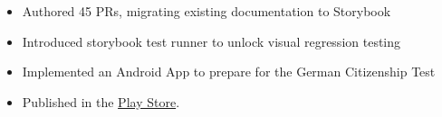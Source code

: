 \documentclass[10pt,a4paper,ragged2e,withhyper]{altacv}
\begin{document}
\begin{paracol}{2}


\begin{itemize}
  \item Authored 45 PRs, migrating existing documentation to Storybook
  \item Introduced storybook test runner to unlock visual regression testing
\end{itemize}

\medskip


\begin{itemize}
  \item Implemented an Android App to prepare for the German Citizenship Test
  \item Published in the \href{https://play.google.com/store/apps/details?id=com.nrieble.quizapp}{Play Store}.
\end{itemize}




\medskip



\newpage

\switchcolumn






\end{paracol}
\end{document}
